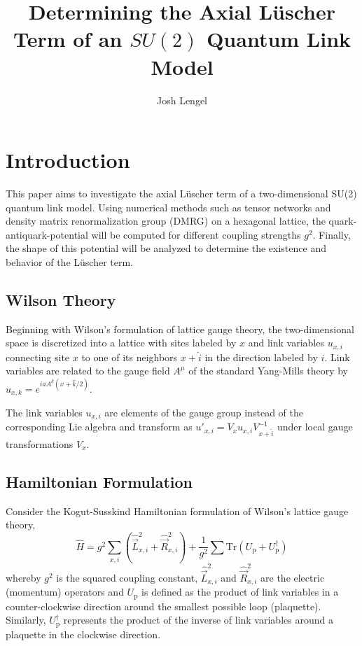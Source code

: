 \documentclass[a4paper,oneside, 11pt,english,listof=totoc,bibliography=totoc]{scrbook}
\title{Determining the Axial L{\"u}scher Term of an $SU(2)$ Quantum Link Model}
\author{Josh Lengel}
\date{}
\begin{document}
\frontmatter{}

\maketitle

\tableofcontents

\mainmatter{}

\chapter{Introduction}
This paper aims to investigate the axial L{\"u}scher term of a two-dimensional SU(2) quantum link model. Using numerical methods such as tensor networks and density matrix renormalization group (DMRG) on a hexagonal lattice, the quark-antiquark-potential will be computed for different coupling strengths $g^2$. Finally, the shape of this potential will be analyzed to determine the existence and behavior of the L\"uscher term.

\section{Wilson Theory}
Beginning with Wilson's formulation of lattice gauge theory\cite{Gattringer}, the two-dimensional space is discretized into a lattice with sites labeled by $x$ and link variables $u_{x,i}$ connecting site $x$ to one of its neighbors $x+\hat{i}$ in the direction labeled by $i$. Link variables are related to the gauge field $A^\mu$ of the standard Yang-Mills theory by $u_{x,k}=e^{iaA^k\left(x+\hat{k}/2\right)}$.

The link variables $u_{x,i}$ are elements of the gauge group instead of the corresponding Lie algebra and transform as $u'_{x,i}=V_{x}u_{x,i}V^{-1}_{x+\hat{i}}$ under local gauge transformations $V_x$. 

\section{Hamiltonian Formulation}
Consider the Kogut-Susskind Hamiltonian formulation of Wilson's lattice gauge theory,
\begin{equation}\label{eq:hamiltonian}
    \hat{H}=g^2\sum\limits_{x,i}\left({\hat{\vec{L}}}^2_{x,i} + {\hat{\vec{R}}}^2_{x,i}\right)+\frac{1}{g^2}\sum\mathrm{Tr}\left(U_\mathrm{p}+U^\dagger_\mathrm{p}\right)
\end{equation}
whereby $g^2$ is the squared coupling constant, ${\hat{\vec{L}}}^2_{x,i}$ and ${\hat{\vec{R}}}^2_{x,i}$ are the electric (momentum) operators and $U_\mathrm{p}$ is defined as the product of link variables in a counter-clockwise direction around the smallest possible loop (plaquette). Similarly, $U^\dagger_\mathrm{p}$ represents the product of the inverse of link variables around a plaquette in the clockwise direction\cite{KogutSusskind}.
\end{document}
